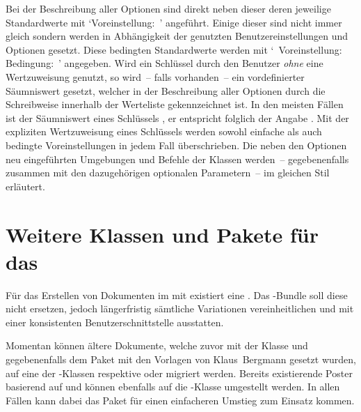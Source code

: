 Bei der Beschreibung aller Optionen sind direkt neben dieser deren jeweilige 
Standardwerte mit \mbox{\enquote*{Voreinstellung: }} angeführt. 
Einige dieser sind nicht immer gleich sondern werden in Abhängigkeit der 
genutzten Benutzereinstellungen und Optionen gesetzt. Diese bedingten 
Standardwerte werden mit 
\mbox{\enquote*{%
  Voreinstellung: \,\textbar\,Bedingung: %
}}
angegeben. Wird ein Schlüssel durch den Benutzer \emph{ohne} eine Wertzuweisung 
genutzt, so wird~-- falls vorhanden~-- ein vordefinierter Säumniswert gesetzt, 
welcher in der Beschreibung aller Optionen durch die~ 
Schreibweise innerhalb der Werteliste gekennzeichnet ist. In den meisten Fällen 
ist der Säumniswert eines Schlüssels , er entspricht folglich der 
Angabe . Mit der expliziten Wertzuweisung eines 
Schlüssels werden sowohl einfache als auch bedingte Voreinstellungen in jedem 
Fall überschrieben. Die neben den Optionen neu eingeführten Umgebungen und 
Befehle der Klassen werden~-- gegebenenfalls zusammen mit den dazugehörigen 
optionalen Parametern~-- im gleichen Stil erläutert.


\section{%
  Weitere Klassen und Pakete für das \CD%
  \label{sec:tudclasses}%
}
%
Für das Erstellen von Dokumenten im \TUDCD mit  existiert eine 
. Das \TUDScript-Bundle soll diese nicht ersetzen, 
jedoch längerfristig sämtliche Variationen vereinheitlichen und mit einer 
konsistenten Benutzerschnittstelle ausstatten. 

Momentan können ältere Dokumente, welche zuvor mit der Klasse 
 und gegebenenfalls dem Paket 
 mit den Vorlagen von Klaus~Bergmann 
gesetzt wurden, auf eine der \TUDScript-Klassen  respektive 
 oder  migriert werden. Bereits 
existierende Poster basierend auf  und 
 können ebenfalls auf die 
\TUDScript-Klasse  umgestellt werden. In allen Fällen kann 
dabei das Paket  für einen einfacheren Umstieg zum Einsatz 
kommen. 

